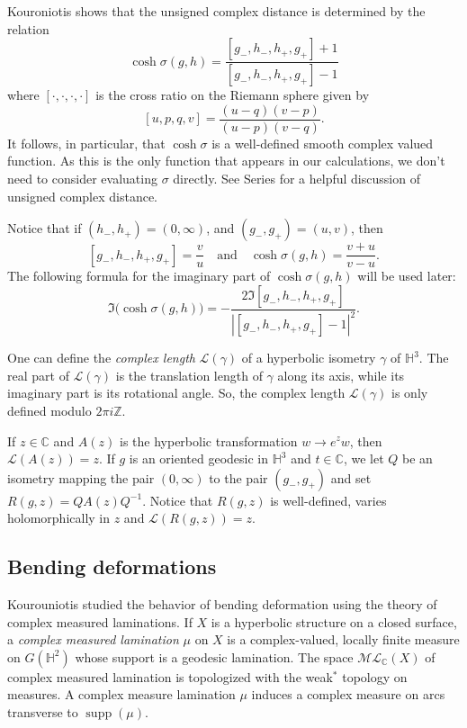 \documentclass{amsart}
\theoremstyle{plain}
\theoremstyle{definition}
\theoremstyle{remark}
\newcommand{\CC}{\mathbb C}
\newcommand{\Hp}{{\mathbb H}^2}
\newcommand{\supp}{{\operatorname{supp}}}
\newcommand{\<}{\left <}
\renewcommand{\>}{\right >}
\begin{document}
 
Kouroniotis \cite[Lemma 2.1]{kouron} shows that the unsigned complex distance is determined by the relation
 $$\cosh\sigma(g,h) = \frac{[g_-, h_-, h_+,g_+]+ 1}{[g_-, h_-, h_+,g_+]-1}$$
 where $[\cdot,\cdot,\cdot,\cdot]$ is the  cross ratio on the Riemann sphere given by
 $$[u,p,q,v] = \frac{(u-q)(v-p)}{(u-p)(v-q)}.$$
 It follows, in particular, that $\cosh\sigma$ is a well-defined smooth complex valued function.  As this is the only function that appears in our calculations, 
 we don't need to consider evaluating $\sigma$ directly. See Series \cite{series} for a helpful discussion of unsigned complex distance. 
 
Notice that if  $(h_-, h_+)  = (0,\infty)$, and $(g_-,g_+)= (u,v)$, then
$$[g_-, h_-, h_+,g_+] = \frac{v}{u} \quad\text{and}\quad \cosh\sigma(g,h) = \frac{v+u}{v-u}.$$
The following formula for the imaginary part of $ \cosh\sigma(g,h)$ will be used later:
\begin{equation}
\label{Im-cr} \Im \Big(\cosh\sigma(g,h)\Big)= -\frac{2\Im [g_-, h_-, h_+,g_+]}{|[g_-, h_-, h_+,g_+]-1|^2}.
\end{equation}


One can define the {\em complex length} $\mathcal L(\gamma)$ of a hyperbolic isometry $\gamma$ of $\mathbb H^3$. The real part
of $\mathcal L(\gamma)$ is the translation length of $\gamma$ along its axis, while its imaginary part is its
rotational angle. So, the complex length $\mathcal L(\gamma)$ is only defined modulo $2\pi i \mathbb Z$.

If $z\in\mathbb C$ and $A(z)$ is the hyperbolic transformation $w\rightarrow e^z w$, then $\mathcal L(A(z))=z$. 
If $g$ is an oriented  geodesic in $\mathbb H^3$ and $t\in\mathbb C$, we let $Q$ be an isometry mapping the pair $(0,\infty)$ to the pair $(g_-,g_+)$
and set $R(g,z) = Q A(z) Q^{-1}$. Notice that $R(g,z)$ is well-defined, varies holomorphically in $z$ and  $\mathcal L(R(g,z))=z$.


\subsection{Bending deformations}


Kourouniotis \cite{kouron-cont} studied the behavior of bending deformation using the theory of complex measured laminations.
If $X$ is a hyperbolic structure on a closed surface, 
a {\em complex measured lamination} $\mu$ on $X$ is a complex-valued, locally finite measure on
$G(\Hp)$ whose support is a geodesic lamination.
The space $\mathcal{ML}_\CC(X)$ of complex measured lamination is topologized with  the weak$^*$ topology on measures. 
A complex measure lamination $\mu$ induces a complex measure on arcs transverse to $\supp(\mu)$.
\end{document}
